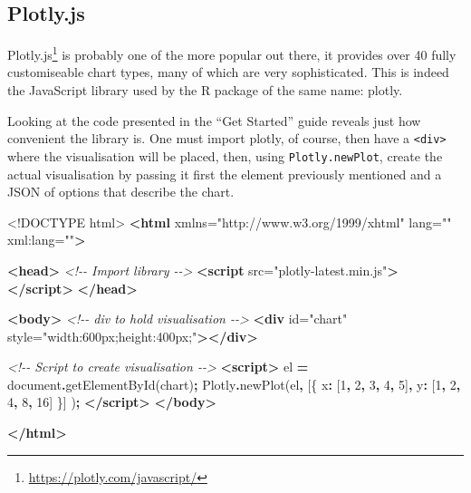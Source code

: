 \documentclass[
]{krantz}
\makeatletter
\newenvironment{Shaded}{\begin{snugshade}}{\end{snugshade}}
\newcommand{\BuiltInTok}[1]{#1}
\newcommand{\CommentTok}[1]{\textcolor[rgb]{0.37,0.37,0.37}{\textit{#1}}}
\newcommand{\DataTypeTok}[1]{\textcolor[rgb]{0.27,0.27,0.27}{#1}}
\newcommand{\DecValTok}[1]{\textcolor[rgb]{0.06,0.06,0.06}{#1}}
\newcommand{\FunctionTok}[1]{\textcolor[rgb]{0,0,0}{#1}}
\newcommand{\KeywordTok}[1]{\textcolor[rgb]{0.27,0.27,0.27}{\textbf{#1}}}
\newcommand{\NormalTok}[1]{#1}
\newcommand{\OperatorTok}[1]{\textcolor[rgb]{0.43,0.43,0.43}{\textbf{#1}}}
\newcommand{\OtherTok}[1]{\textcolor[rgb]{0.37,0.37,0.37}{#1}}
\newcommand{\StringTok}[1]{\textcolor[rgb]{0.5,0.5,0.5}{#1}}
\renewcommand{\href}[2]{#2\footnote{\url{#1}}}
\newenvironment{kframe}{%
\medskip{}
\setlength{\fboxsep}{.8em}
 \def\at@end@of@kframe{}%
 \ifinner\ifhmode%
  \def\at@end@of@kframe{\end{minipage}}%
  \begin{minipage}{\columnwidth}%
 \fi\fi%
 \def\FrameCommand##1{\hskip\@totalleftmargin \hskip-\fboxsep
 \colorbox{shadecolor}{##1}\hskip-\fboxsep
     \hskip-\linewidth \hskip-\@totalleftmargin \hskip\columnwidth}%
 \MakeFramed {\advance\hsize-\width
   \@totalleftmargin\z@ \linewidth\hsize
   \@setminipage}}%
 {\par\unskip\endMakeFramed%
 \at@end@of@kframe}
\renewenvironment{Shaded}{\begin{kframe}}{\end{kframe}}
\makeatother
\begin{document}
\hypertarget{widgets-basics-candidates-plotly}{%
\subsection{Plotly.js}\label{widgets-basics-candidates-plotly}}

\href{https://plotly.com/javascript/}{Plotly.js} is probably one of the more popular out there, it provides over 40 fully customiseable chart types, many of which are very sophisticated. This is indeed the JavaScript library used by the R package of the same name: plotly.

Looking at the code presented in the ``Get Started'' guide reveals just how convenient the library is. One must import plotly, of course, then have a \texttt{\textless{}div\textgreater{}} where the visualisation will be placed, then, using \texttt{Plotly.newPlot}, create the actual visualisation by passing it first the element previously mentioned and a JSON of options that describe the chart.

\begin{Shaded}
\begin{Highlighting}[]
\DataTypeTok{\textless{}!DOCTYPE }\NormalTok{html}\DataTypeTok{\textgreater{}}
\KeywordTok{\textless{}html}\OtherTok{ xmlns=}\StringTok{"http://www.w3.org/1999/xhtml"}\OtherTok{ lang=}\StringTok{""}\OtherTok{ xml:lang=}\StringTok{""}\KeywordTok{\textgreater{}}

\KeywordTok{\textless{}head\textgreater{}}
  \CommentTok{\textless{}!{-}{-} Import library {-}{-}\textgreater{}}
  \KeywordTok{\textless{}script}\OtherTok{ src=}\StringTok{"plotly{-}latest.min.js"}\KeywordTok{\textgreater{}\textless{}/script\textgreater{}}
\KeywordTok{\textless{}/head\textgreater{}}

\KeywordTok{\textless{}body\textgreater{}}
  \CommentTok{\textless{}!{-}{-} div to hold visualisation {-}{-}\textgreater{}}
  \KeywordTok{\textless{}div}\OtherTok{ id=}\StringTok{"chart"}\OtherTok{ style=}\StringTok{"width:600px;height:400px;"}\KeywordTok{\textgreater{}\textless{}/div\textgreater{}}

  \CommentTok{\textless{}!{-}{-} Script to create visualisation {-}{-}\textgreater{}}
  \KeywordTok{\textless{}script\textgreater{}}
\NormalTok{    el }\OperatorTok{=} \BuiltInTok{document}\OperatorTok{.}\FunctionTok{getElementById}\NormalTok{(}\StringTok{\textquotesingle{}chart\textquotesingle{}}\NormalTok{)}\OperatorTok{;}
\NormalTok{    Plotly}\OperatorTok{.}\FunctionTok{newPlot}\NormalTok{(el}\OperatorTok{,}\NormalTok{ [\{}
      \DataTypeTok{x}\OperatorTok{:}\NormalTok{ [}\DecValTok{1}\OperatorTok{,} \DecValTok{2}\OperatorTok{,} \DecValTok{3}\OperatorTok{,} \DecValTok{4}\OperatorTok{,} \DecValTok{5}\NormalTok{]}\OperatorTok{,}
      \DataTypeTok{y}\OperatorTok{:}\NormalTok{ [}\DecValTok{1}\OperatorTok{,} \DecValTok{2}\OperatorTok{,} \DecValTok{4}\OperatorTok{,} \DecValTok{8}\OperatorTok{,} \DecValTok{16}\NormalTok{] \}]}
\NormalTok{    )}\OperatorTok{;}
  \KeywordTok{\textless{}/script\textgreater{}}
\KeywordTok{\textless{}/body\textgreater{}}

\KeywordTok{\textless{}/html\textgreater{}}
\end{Highlighting}
\end{Shaded}
\end{document}
